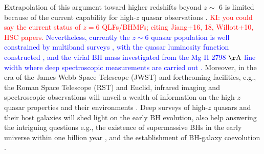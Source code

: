 \documentclass[twocolumn, twocolappendix]{aastex63}
\newcommand{\red}[1]{\textcolor{red}{ #1}}
\newcommand{\blue}[1]{\textcolor{blue}{ #1}}
\begin{document}
\begin{CJK*}{UTF8}{gbsn}
Extrapolation of this argument toward higher redshifts beyond $z\sim$ 6 is limited because of the current capability for
high-$z$ quasar observations \citep{2013ApJ...768..105M,2016ApJ...829...33Y,2019ApJ...884...30W,2019BAAS...51c.121F}.
\red{KI: you could say the current status of $z=6$ QLFs/BHMFs; citing Jiang+16, 18, Willott+10, HSC papers.}
\blue{
Nevertheless, currently the $z\sim 6$ quasar population is well constrained by multiband surveys 
\citep{2008AJ....135.1057J,2010AJ....139..906W,2016arXiv161205560C,2016ApJ...833..222J,2018PASJ...70S..35M,2019ApJ...883..183M,2019AJ....157..168D},
with the quasar luminosity function constructed \citep[e.g.,][]{2018ApJ...869..150M}, 
and the virial BH mass investigated from the Mg II 2798 $\rm{\AA}$ line width where deep spectroscopic measurements are carried out
\citep{2007AJ....134.1150J,2007ApJ...669...32K,2010AJ....140..546W,2018Natur.553..473B,2019ApJ...880...77O,2019ApJ...873...35S}. 
}
Moreover, in the era of the James Webb Space Telescope (JWST) and forthcoming facilities,
e.g., the Roman Space Telescope (RST) and Euclid,
infrared imaging and spectroscopic observations will unveil a wealth of information on the
high-$z$ quasar properties and their environments 
\citep{2019BAAS...51c..45R, 2019arXiv190205569A, 2011arXiv1110.3193L}. 
Deep surveys of high-$z$ quasars and their host galaxies will shed light on the early BH evolution, 
also help answering the intriguing questions e.g., 
the existence of supermassive BHs in the early universe within one billion year 
\citep{2012Sci...337..544V,2013ASSL..396..293H,2020ARA&A..58...27I}, 
and the establishment of BH-galaxy coevolution 
\citep[e.g.,][]{2013ApJ...773...44W,2017ApJ...851L...8V,2021ApJ...914...36I,2022ApJ...927..237I,2022MNRAS.511.3751H}.




\end{CJK*}
\end{document}
